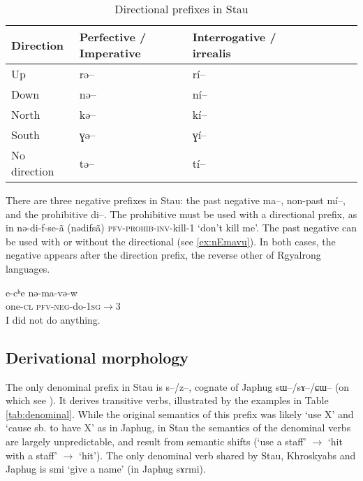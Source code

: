 \documentclass[oneside,a4paper,11pt]{article}
\newcommand{\ipa}[1]{{\phon #1}} %
\begin{document}
\begin{table}[h]
\caption{Directional prefixes in Stau} 
\label{tab:dir.pref} \centering
\begin{tabular}{llllllll}
\toprule
Direction & Perfective / Imperative & Interrogative / irrealis \\
\midrule
 Up & \ipa{rə--} & \ipa{rí--} \\
Down & \ipa{nə--} & \ipa{ní--} \\
North  & \ipa{kə--} & \ipa{kí--} \\
South & \ipa{ɣə--} & \ipa{ɣí--} \\
No direction & \ipa{tə--} & \ipa{tí--} \\
\bottomrule
\end{tabular}
\end{table}

There are three negative prefixes in Stau: the past negative \ipa{ma--}, non-past \ipa{mí--}, and the prohibitive \ipa{di--}. The prohibitive must be used with a directional prefix, as in   \ipa{nə-di-f-se-ã}  (\ipa{nədifsã}) \textsc{pfv-prohib-inv}-kill-1 `don't kill me'. The past negative can be used with or without the directional (see \ref{ex:nEmavu}). In both cases, the negative appears after the direction prefix, the reverse other of Rgyalrong languages.


\begin{exe}
\ex \label{ex:nEmavu} 
\gll
\ipa{e-cʰe} 	\ipa{nə-ma-və-w}  \\
one-\textsc{cl} \textsc{pfv-neg}-do-\textsc{1sg}$\rightarrow$3 \\
\glt I did not do anything.
\end{exe}


 \subsection{Derivational morphology}
 
The only denominal prefix in Stau is \ipa{s--/z--}, cognate of Japhug \ipa{sɯ--/sɤ--/ɕɯ--} (on which see \citealt[14-17]{jacques14antipassive}). It derives transitive verbs, illustrated by the examples in Table \ref{tab:denominal}. While the original semantics of this prefix was likely `use X' and `cause sb. to have X' as in Japhug, in Stau the semantics of the denominal verbs are largely unpredictable, and result from semantic shifts (`use a staff' $\rightarrow$ `hit with a staff' $\rightarrow$  `hit'). The only denominal verb shared by Stau, Khroskyabs and Japhug is \ipa{smi} `give a name' (in Japhug \ipa{sɤrmi}).
 
\end{document}

